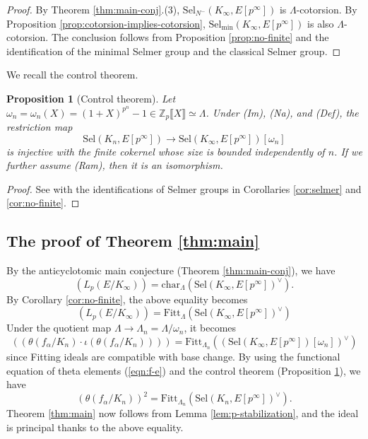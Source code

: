 \documentclass[11pt]{amsart}
\numberwithin{equation}{section}
\newtheorem{prop}[thm]{Proposition}
\theoremstyle{definition}
\begin{document}
\begin{proof}
By Theorem \ref{thm:main-conj}.(3), $\mathrm{Sel}_{N^-}(K_\infty, E[p^\infty])$ is $\Lambda$-cotorsion.
By Proposition \ref{prop:cotorsion-implies-cotorsion},  $\mathrm{Sel}_{\mathrm{min}}(K_\infty, E[p^\infty])$ is also $\Lambda$-cotorsion.
The conclusion follows from Proposition \ref{prop:no-finite} and the identification of the minimal Selmer group and the classical Selmer group.
\end{proof}
We recall the control theorem.
\begin{prop}[Control theorem] \label{prop:control}
Let $\omega_n = \omega_n(X) = (1+X)^{p^n} -1 \in \mathbb{Z}_p\llbracket X \rrbracket \simeq \Lambda$.  %
Under (Im), (Na), and (Def), the restriction map
$$\mathrm{Sel}(K_n, E[p^\infty]) \to \mathrm{Sel}(K_\infty, E[p^\infty])[\omega_n] $$
is injective with the finite cokernel whose size is bounded independently of $n$. If we further assume (Ram),
then it is an isomorphism.
\end{prop}
\begin{proof}
See \cite[Prop. 1.9]{chida-hsieh-main-conj} with the identifications of Selmer groups in Corollaries \ref{cor:selmer} and \ref{cor:no-finite}.
\end{proof}

\subsection{The proof of Theorem \ref{thm:main}}
By the anticyclotomic main conjecture (Theorem \ref{thm:main-conj}), we have
$$\left( L_p(E/K_\infty) \right) = \mathrm{char}_{\Lambda} \left( \mathrm{Sel}(K_\infty, E[p^\infty])^\vee \right) .$$
By Corollary \ref{cor:no-finite}, the above equality becomes
$$\left( L_p(E/K_\infty) \right) = \mathrm{Fitt}_{\Lambda} \left( \mathrm{Sel}(K_\infty, E[p^\infty])^\vee \right)$$
Under the quotient map $\Lambda \to \Lambda_n = \Lambda / \omega_n$, it becomes
$$\left( \left(  \theta(f_\alpha/K_n) \cdot \iota( \theta(f_\alpha/K_n) ) \right) \right) = \mathrm{Fitt}_{\Lambda_n} \left( \left( \mathrm{Sel}(K_\infty, E[p^\infty]) [\omega_n]\right)^\vee \right)$$
since Fitting ideals are compatible with base change.
By using the functional equation of theta elements (\ref{eqn:f-e}) and the control theorem (Proposition \ref{prop:control}), we have
$$\left(  \theta(f_\alpha/K_n)  \right)^2 = \mathrm{Fitt}_{\Lambda_n} \left(  \mathrm{Sel}(K_n, E[p^\infty])^\vee \right) .$$
Theorem \ref{thm:main} now follows from Lemma \ref{lem:p-stabilization}, and the ideal is principal thanks to the above equality.






\end{document}
